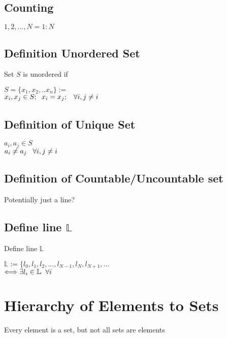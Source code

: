 \documentclass[11pt]{article}
\begin{document}
\subsection{Counting}
\begin{center}
$1,2,...,N = 1:N$
\end{center}



\subsection{Definition Unordered Set}
Set $S$ is unordered if
\begin{center}
$
S = \{x_1,x_2,..x_n\} :=
$
\\
$
x_i,x_j \in S; \hspace{2mm} x_i = x_j; \hspace{3mm}\forall i,j \neq i
$
\end{center}





\subsection{Definition of Unique Set}
\begin{center}
$
a_i, a_j \in S
$
\\
$
a_i \neq a_j \hspace{3mm} \forall i,j \neq i
$
\end{center}





\subsection{Definition of Countable/Uncountable set}
Potentially just a line?
\subsection{Define line $\mathbb{L}$}
Define line $\mathbb{L}$
\begin{center}
$
\mathbb{L} := \{l_0,l_{1},l_{2},...,l_{N-1},l_N,l_{N+1},...
$
\\
$
\Longleftrightarrow \exists l_i \in \mathbb{L} \hspace{2mm} \forall i
$
\end{center}


\section{Hierarchy of Elements to Sets}
Every element is a set, but not all sets are elements
\end{document}
